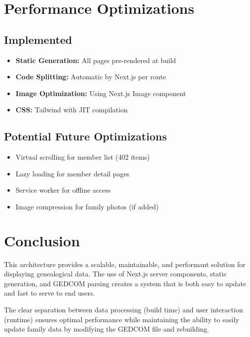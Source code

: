 \documentclass[11pt]{article}
\begin{document}
\section{Performance Optimizations}

\subsection{Implemented}
\begin{itemize}
    \item \textbf{Static Generation:} All pages pre-rendered at build
    \item \textbf{Code Splitting:} Automatic by Next.js per route
    \item \textbf{Image Optimization:} Using Next.js Image component
    \item \textbf{CSS:} Tailwind with JIT compilation
\end{itemize}

\subsection{Potential Future Optimizations}
\begin{itemize}
    \item Virtual scrolling for member list (402 items)
    \item Lazy loading for member detail pages
    \item Service worker for offline access
    \item Image compression for family photos (if added)
\end{itemize}

\section{Conclusion}

This architecture provides a scalable, maintainable, and performant solution for displaying genealogical data. The use of Next.js server components, static generation, and GEDCOM parsing creates a system that is both easy to update and fast to serve to end users.

The clear separation between data processing (build time) and user interaction (runtime) ensures optimal performance while maintaining the ability to easily update family data by modifying the GEDCOM file and rebuilding.
\end{document}
